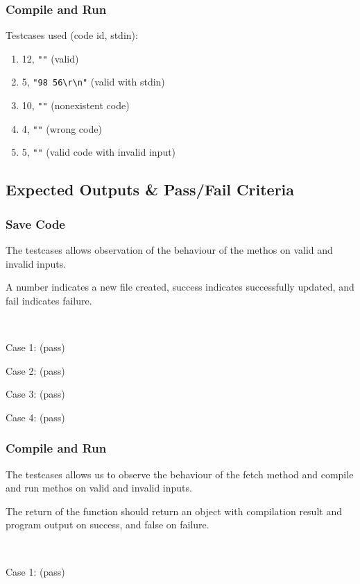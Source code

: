 \subsubsection{Compile and Run}
Testcases used (code id, stdin):
\begin{enumerate}
  \item 12, \verb|""| (valid)
  \item 5, \verb|"98 56\r\n"| (valid with stdin)
  \item 10, \verb|""| (nonexistent code)
  \item 4, \verb|""| (wrong code)
  \item 5, \verb|""| (valid code with invalid input)
\end{enumerate}

\subsection{Expected Outputs \& Pass/Fail Criteria}

\subsubsection{Save Code}
The testcases allows observation of the behaviour of the methos on valid and invalid inputs.

A number indicates a new file created, success indicates successfully updated, and fail indicates failure.

~

Case 1: (pass)


Case 2: (pass)


Case 3: (pass)


Case 4: (pass)


\subsubsection{Compile and Run}
The testcases allows us to observe the behaviour of the fetch method and compile and run methos on valid and invalid inputs.

The return of the function should return an object with compilation result and program output on success, and false on failure.

~

Case 1: (pass)


